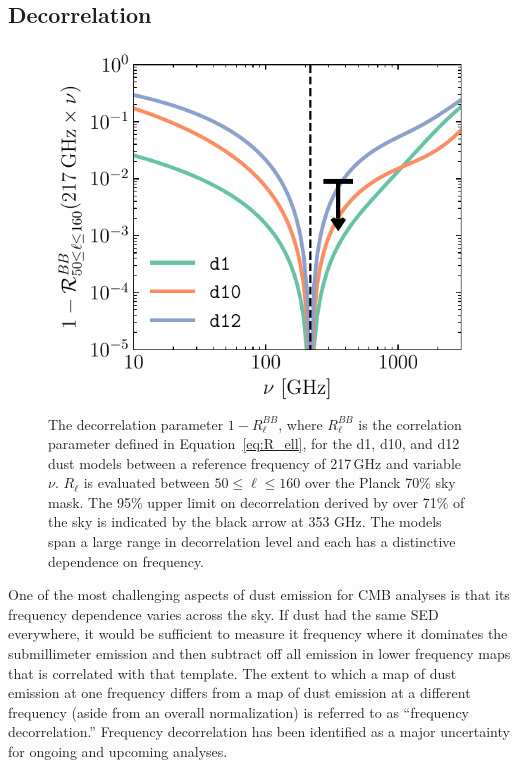 \documentclass[twocolumn]{aastex631}
\begin{document}
\subsection{Decorrelation} \label{subsec:decorrelation}

\begin{figure}
    \centering
    \includegraphics[width=\columnwidth]{figures/decorrelation_dust.pdf}
    \caption{The decorrelation parameter $1-R_\ell^{BB}$, where $R_\ell^{BB}$ is the correlation parameter defined in Equation~\eqref{eq:R_ell}, for the d1, d10, and d12 dust models between a reference frequency of 217\,GHz and variable $\nu$. $R_\ell$ is evaluated between $50 \leq \ell \leq 160$ over the Planck 70\% sky mask. The 95\% upper limit on decorrelation derived by \citet{planck2016-l11A} over 71\% of the sky is indicated by the black arrow at 353 GHz. The models span a large range in decorrelation level and each has a distinctive dependence on frequency.}
    \label{fig:decorrelation}
\end{figure}

One of the most challenging aspects of dust emission for CMB analyses is that its frequency dependence varies across the sky. If dust had the same SED everywhere, it would be sufficient to measure it frequency where it dominates the submillimeter emission and then subtract off all emission in lower frequency maps that is correlated with that template. The extent to which a map of dust emission at one frequency differs from a map of dust emission at a different frequency (aside from an overall normalization) is referred to as ``frequency decorrelation.'' Frequency decorrelation has been identified as a major uncertainty for ongoing and upcoming analyses.
\end{document}
